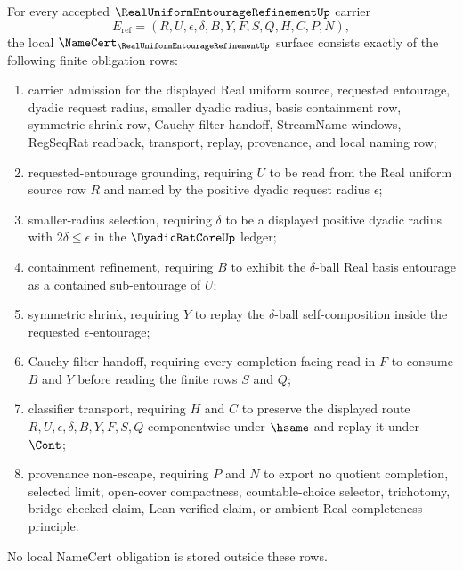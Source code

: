 \begin{theorem}
\label{thm:real-uniform-entourage-refinement-obligations}
For every accepted $\RealUniformEntourageRefinementUp$ carrier
$$
E_{\mathrm{ref}}=(R,U,\epsilon,\delta,B,Y,F,S,Q,H,C,P,N),
$$
the local $\NameCert_{\RealUniformEntourageRefinementUp}$ surface consists exactly of the following finite obligation rows:
\begin{enumerate}
\item carrier admission for the displayed Real uniform source, requested entourage, dyadic request radius, smaller dyadic radius, basis containment row, symmetric-shrink row, Cauchy-filter handoff, StreamName windows, RegSeqRat readback, transport, replay, provenance, and local naming row;
\item requested-entourage grounding, requiring $U$ to be read from the Real uniform source row $R$ and named by the positive dyadic request radius $\epsilon$;
\item smaller-radius selection, requiring $\delta$ to be a displayed positive dyadic radius with $2\delta\leq\epsilon$ in the $\DyadicRatCoreUp$ ledger;
\item containment refinement, requiring $B$ to exhibit the $\delta$-ball Real basis entourage as a contained sub-entourage of $U$;
\item symmetric shrink, requiring $Y$ to replay the $\delta$-ball self-composition inside the requested $\epsilon$-entourage;
\item Cauchy-filter handoff, requiring every completion-facing read in $F$ to consume $B$ and $Y$ before reading the finite rows $S$ and $Q$;
\item classifier transport, requiring $H$ and $C$ to preserve the displayed route $R,U,\epsilon,\delta,B,Y,F,S,Q$ componentwise under $\hsame$ and replay it under $\Cont$;
\item provenance non-escape, requiring $P$ and $N$ to export no quotient completion, selected limit, open-cover compactness, countable-choice selector, trichotomy, bridge-checked claim, Lean-verified claim, or ambient Real completeness principle.
\end{enumerate}
No local NameCert obligation is stored outside these rows.
\end{theorem}
